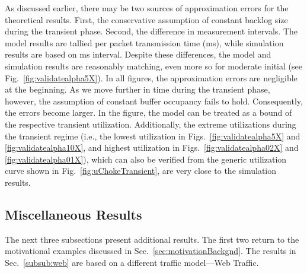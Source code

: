 \documentclass{IEEEtran}
\begin{document}
    As discussed earlier, there may be two sources of approximation errors for the theoretical results. First, the conservative assumption of constant backlog size during the transient phase. Second, the difference in measurement intervals. The model results are tallied per packet transmission time (ms), while simulation results are based on ms interval. Despite these differences, the model and simulation results are reasonably matching, even more so for moderate initial  (see Fig.~\ref{fig:validatealpha5X}). In all figures, the approximation errors are negligible at the beginning. As we move further in time during the transient phase, however, the assumption of constant buffer occupancy  fails to hold. Consequently, the errors become larger.  In the figure, the model can be treated as a bound of the respective transient utilization. Additionally, the extreme utilizations during the transient regime (i.e., the lowest utilization in Figs.~\ref{fig:validatealpha5X} and \ref{fig:validatealpha10X}, and highest utilization in Figs.~\ref{fig:validatealpha02X} and \ref{fig:validatealpha01X}), which can also be verified from the generic utilization curve shown in Fig.~\ref{fig:uChokeTransient}, are very close to the simulation results. 
    \subsection{Miscellaneous Results}\label{subsec:furtherResults}

     The next three subsections present additional results. The first two return to the motivational examples discussed in Sec.~\ref{sec:motivationBackgnd}. The results in Sec.~\ref{subsub:web} are based on a different traffic model---Web Traffic.
\end{document}
